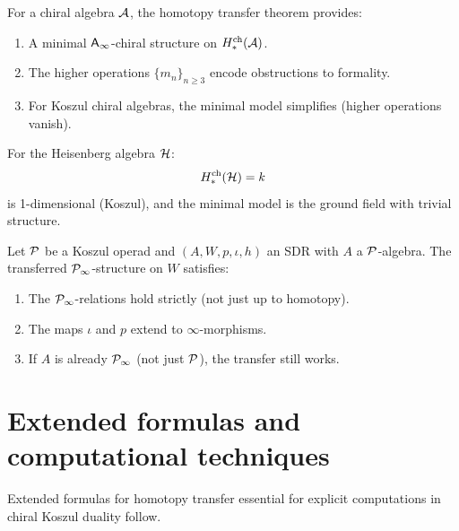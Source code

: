 \begin{application}
\label{app:minimal-chiral}
For a chiral algebra $\mathcal{A}$, the homotopy transfer theorem provides:
\begin{enumerate}[label=(\roman*)]
\item A minimal $\mathsf{A}_{\infty}$-chiral structure on $H^{\mathrm{ch}}_*(\mathcal{A})$.
\item The higher operations $\{m_n\}_{n \geq 3}$ encode obstructions to formality.
\item For Koszul chiral algebras, the minimal model simplifies (higher operations vanish).
\end{enumerate}

For the Heisenberg algebra $\mathcal{H}$:
\[
H^{\mathrm{ch}}_*(\mathcal{H}) = k
\]
is 1-dimensional (Koszul), and the minimal model is the ground field with 
trivial structure.
\end{application}

\begin{theorem}
\label{thm:htt-operadic}
Let $\mathcal{P}$ be a Koszul operad and $(A, W, p, \iota, h)$ an SDR with $A$ a 
$\mathcal{P}$-algebra. The transferred $\mathcal{P}_\infty$-structure on $W$ satisfies:
\begin{enumerate}[label=(\roman*)]
\item The $\mathcal{P}_\infty$-relations hold strictly (not just up to homotopy).
\item The maps $\iota$ and $p$ extend to $\infty$-morphisms.
\item If $A$ is already $\mathcal{P}_\infty$ (not just $\mathcal{P}$), the transfer still works.
\end{enumerate}
\end{theorem}


\section{Extended formulas and computational techniques}
\label{sec:extended-htt}

Extended formulas for homotopy transfer essential for
explicit computations in chiral Koszul duality follow.

